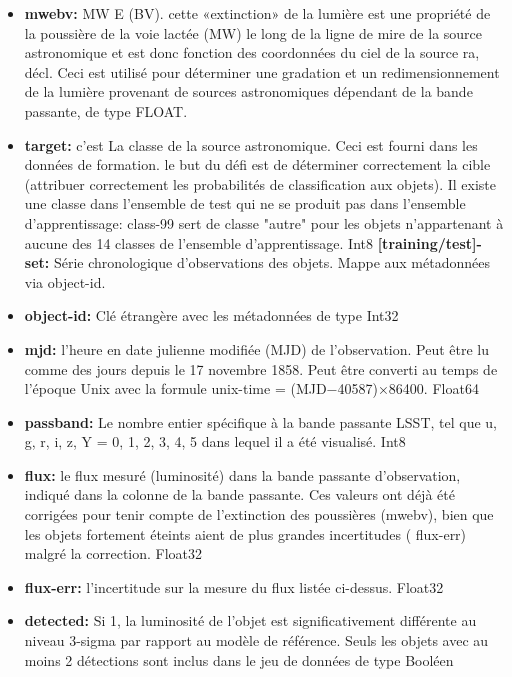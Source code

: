 \begin{itemize}
    \item \textbf {mwebv:} MW E (BV). cette «extinction» de la lumière est une propriété de la poussière de la voie lactée (MW) le long de la ligne de mire de la source astronomique et est donc fonction des coordonnées du ciel de la source ra, décl. Ceci est utilisé pour déterminer une gradation et un redimensionnement de la lumière provenant de sources astronomiques dépendant de la bande passante, de type FLOAT.
    
    \item \textbf {target:} c'est La classe de la source astronomique. Ceci est fourni dans les données de formation. le but du défi est de déterminer correctement la cible (attribuer correctement les probabilités de classification aux objets). Il existe une classe dans l'ensemble de test qui ne se produit pas dans l'ensemble d'apprentissage: class-99 sert de classe "autre" pour les objets n'appartenant à aucune des 14 classes de l'ensemble d'apprentissage. Int8
    \newline
    \textbf{[training/test]-set:} Série chronologique d'observations des objets. Mappe aux métadonnées via object-id.
 
    \item \textbf{object-id:}  Clé étrangère avec les métadonnées de type Int32
    \item \textbf{mjd:} l'heure en date julienne modifiée (MJD) de l'observation. Peut être lu comme des jours depuis le 17 novembre 1858. Peut être converti au temps de l'époque Unix avec la formule unix-time = (MJD−40587)×86400. Float64 
    \item \textbf{ passband:}  Le nombre entier spécifique à la bande passante LSST, tel que u, g, r, i, z, Y = 0, 1, 2, 3, 4, 5 dans lequel il a été visualisé. Int8
    \item \textbf{flux:}  le flux mesuré (luminosité) dans la bande passante d'observation, indiqué dans la colonne de la bande passante. Ces valeurs ont déjà été corrigées pour tenir compte de l'extinction des poussières (mwebv), bien que les objets fortement éteints aient de plus grandes incertitudes ( flux-err) malgré la correction. Float32 
    \item \textbf{ flux-err:} l'incertitude sur la mesure du flux listée ci-dessus. Float32  
    \item\textbf{detected:} Si 1, la luminosité de l'objet est significativement différente au niveau 3-sigma par rapport au modèle de référence. Seuls les objets avec au moins 2 détections sont inclus dans le jeu de données de type Booléen
\end{itemize}

